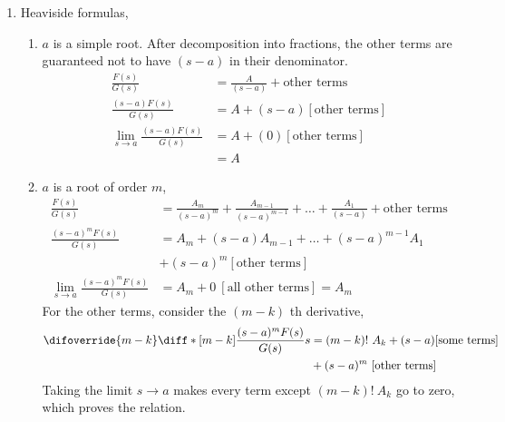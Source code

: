 \begin{enumerate}
    \item Heaviside formulas,
          \begin{enumerate}
              \item $ a $ is a simple root. After decomposition into fractions, the other
                    terms are guaranteed not to have $ (s-a) $ in their denominator.
                    \begin{align}
                        \frac{F(s)}{G(s)}      & = \frac{A}{(s-a)}
                        + \text{other terms}                                      \\
                        \frac{(s-a)F(s)}{G(s)} & = A + (s-a) [\text{other terms}] \\
                        \lim_{s \to a}
                        \frac{(s-a)F(s)}{G(s)} & = A + (0) [\text{other terms}]   \\
                                               & = A
                    \end{align}

              \item $ a $ is a root of order $ m $,
                    \begin{align}
                        \frac{F(s)}{G(s)}         & = \frac{A_m}{(s-a)^m}
                        + \frac{A_{m-1}} {(s-a)^{m-1}} + \dots
                        + \frac{A_1}{(s-a)} + \text{other terms}                   \\
                        \frac{(s-a)^m F(s)}{G(s)} & = A_m + (s-a)A_{m-1} + \dots
                        + (s-a)^{m-1}A_1                                           \\
                                                  & + (s-a)^m [\text{other terms}] \\
                        \lim_{s \to a}
                        \frac{(s-a)^m F(s)}{G(s)} & = A_m + 0
                        \ [\text{all other terms}]
                        = A_m
                    \end{align}
                    For the other terms, consider the $ (m-k)$ th derivative,
                    \begin{align}
                        \difoverride{m-k}
                        \diff*[m-k]{\frac{(s-a)^m F(s)}
                        {G(s)}}{s} & = (m-k)!\ A_k
                        + (s-a) [\text{some terms}]                  \\
                                   & + (s-a)^m\ [\text{other terms}]
                    \end{align}
                    Taking the limit $ s \to a$ makes every term except
                    $ (m-k)!\ A_k $ go to zero, which proves the relation.
          \end{enumerate}


\end{enumerate}
